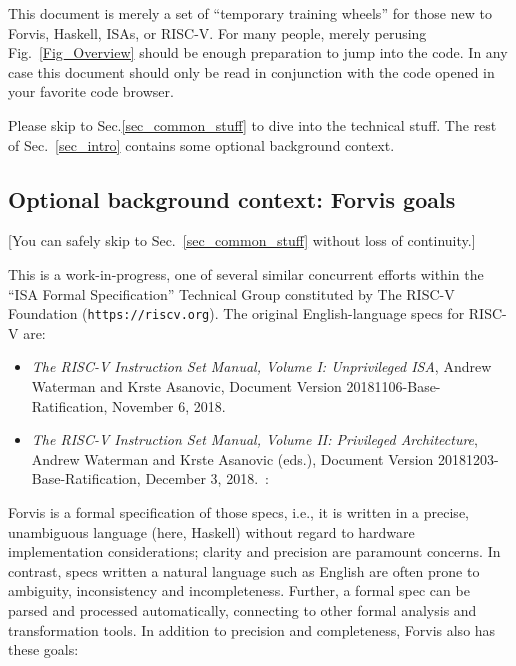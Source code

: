 \documentclass[11pt]{article}
\begin{document}
This document is merely a set of ``temporary training wheels'' for
those new to Forvis, Haskell, ISAs, or RISC-V.  For many people,
merely perusing Fig.~\ref{Fig_Overview} should be enough preparation
to jump into the code.  In any case this document should only be read
in conjunction with the code opened in your favorite code browser.

Please skip to Sec.\ref{sec_common_stuff} to dive into the technical
stuff.  The rest of Sec.~\ref{sec_intro} contains some optional
background context.


\subsection{Optional background context: Forvis goals}

[You can safely skip to Sec.~\ref{sec_common_stuff} without loss of continuity.]

This is a work-in-progress, one of several similar concurrent efforts
within the ``ISA Formal Specification'' Technical Group constituted by
The RISC-V Foundation ({\tt https://riscv.org}).  The original
English-language specs for RISC-V are:
\begin{itemize}

\item {\it The RISC-V Instruction Set Manual, Volume I: Unprivileged ISA},
    Andrew Waterman and Krste Asanovic,
    Document Version 20181106-Base-Ratification,
    November 6, 2018.~\cite{Waterman2018_user}

\item {\it The RISC-V Instruction Set Manual, Volume II: Privileged
    Architecture}, 
    Andrew Waterman and Krste Asanovic (eds.),
    Document Version 20181203-Base-Ratification,
    December 3, 2018.~\cite{Waterman2018_priv}:

\end{itemize}

Forvis is a formal specification of those specs, i.e., it is written
in a precise, unambiguous language (here, Haskell) without regard to
hardware implementation considerations; clarity and precision are
paramount concerns.  In contrast, specs written a natural language
such as English are often prone to ambiguity, inconsistency and
incompleteness.  Further, a formal spec can be parsed and processed
automatically, connecting to other formal analysis and transformation
tools.  In addition to precision and completeness, Forvis also has
these goals:
\end{document}
